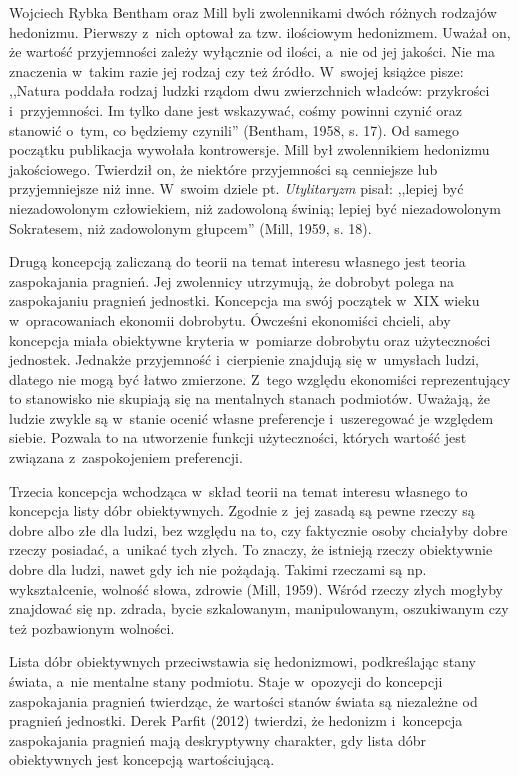 \begin{artplenv}{Wojciech Rybka}
Bentham oraz Mill byli zwolennikami dwóch różnych rodzajów hedonizmu. Pierwszy z~nich optował za tzw. ilościowym
hedonizmem. Uważał on, że wartość przyjemności zależy wyłącznie od ilości, a~nie od jej jakości. Nie ma
znaczenia w~takim razie jej rodzaj czy też źródło. W~swojej książce pisze: ,,Natura poddała rodzaj ludzki rządom dwu zwierzchnich
władców: przykrości i~przyjemności. Im tylko dane jest wskazywać, cośmy powinni czynić oraz stanowić o~tym, co będziemy
czynili'' \label{ref:RNDewCktqXyPy}(Bentham, 1958, s. 17). Od samego początku publikacja wywołała kontrowersje. Mill był
zwolennikiem hedonizmu jakościowego. Twierdził on, że niektóre przyjemności są cenniejsze lub przyjemniejsze niż inne.
W~swoim dziele pt. \textit{Utylitaryzm} pisał: ,,lepiej być niezadowolonym człowiekiem, niż zadowoloną świnią; lepiej
być niezadowolonym Sokratesem, niż zadowolonym głupcem'' \label{ref:RNDYZ2bdeVALU}(Mill, 1959, s. 18). 

Drugą koncepcją zaliczaną do teorii na temat interesu własnego jest teoria zaspokajania pragnień. Jej zwolennicy
utrzymują, że dobrobyt polega na zaspokajaniu pragnień jednostki. Koncepcja ma swój początek w~XIX
wieku w~opracowaniach ekonomii dobrobytu. Ówcześni ekonomiści chcieli, aby koncepcja miała obiektywne kryteria w~pomiarze
dobrobytu oraz użyteczności jednostek. Jednakże przyjemność i~cierpienie znajdują się w~umysłach ludzi, dlatego nie
mogą być łatwo zmierzone. Z~tego względu ekonomiści reprezentujący to stanowisko nie skupiają się na mentalnych stanach
podmiotów. Uważają, że ludzie zwykle są w~stanie ocenić własne preferencje i~uszeregować je względem siebie. Pozwala to
na utworzenie funkcji użyteczności, których wartość jest związana z~zaspokojeniem preferencji.

Trzecia koncepcja wchodząca w~skład teorii na temat interesu własnego to koncepcja listy dóbr obiektywnych.
Zgodnie z~jej zasadą są pewne rzeczy są dobre albo złe dla ludzi, bez względu na to, czy faktycznie osoby chciałyby dobre rzeczy
posiadać, a~unikać tych złych. To znaczy, że istnieją rzeczy obiektywnie dobre dla ludzi, nawet gdy ich nie pożądają.
Takimi rzeczami są np. wykształcenie, wolność słowa, zdrowie \label{ref:RNDWrM4KkB4rX}(Mill, 1959). Wśród rzeczy złych
mogłyby znajdować się np. zdrada, bycie szkalowanym, manipulowanym, oszukiwanym czy też pozbawionym wolności. 

Lista dóbr obiektywnych przeciwstawia się hedonizmowi, podkreślając stany świata, a~nie mentalne stany podmiotu.
Staje w~opozycji do koncepcji zaspokajania pragnień twierdząc, że wartości stanów świata są niezależne od pragnień jednostki.
Derek Parfit \label{ref:RNDaqPqHfiJiI}(2012) twierdzi, że hedonizm i~koncepcja zaspokajania pragnień mają deskryptywny
charakter, gdy lista dóbr obiektywnych jest koncepcją wartościującą.


\end{artplenv}
